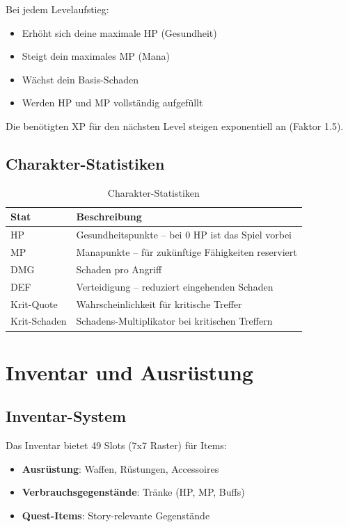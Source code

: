 \documentclass[
  a4paper,
  11pt,
  ngerman,
  parskip=half,
  bibliography=totoc,
  listof=totoc
]{scrreprt}
\begin{document}
Bei jedem Levelaufstieg:
\begin{itemize}
    \item Erhöht sich deine maximale \ac{HP} (Gesundheit)
    \item Steigt dein maximales \ac{MP} (Mana)
    \item Wächst dein Basis-Schaden
    \item Werden \ac{HP} und \ac{MP} vollständig aufgefüllt
\end{itemize}

Die benötigten \ac{XP} für den nächsten Level steigen exponentiell an (Faktor 1.5).

\subsection{Charakter-Statistiken}

\begin{table}[h]
\centering
\caption{Charakter-Statistiken}
\label{tab:stats}
\begin{tabular}{|l|p{8cm}|}
\hline
\textbf{Stat} & \textbf{Beschreibung} \\
\hline
HP & Gesundheitspunkte -- bei 0 HP ist das Spiel vorbei \\
MP & Manapunkte -- für zukünftige Fähigkeiten reserviert \\
DMG & Schaden pro Angriff \\
DEF & Verteidigung -- reduziert eingehenden Schaden \\
Krit-Quote & Wahrscheinlichkeit für kritische Treffer \\
Krit-Schaden & Schadens-Multiplikator bei kritischen Treffern \\
\hline
\end{tabular}
\end{table}

\section{Inventar und Ausrüstung}

\subsection{Inventar-System}

Das Inventar bietet 49 Slots (7x7 Raster) für Items:
\begin{itemize}
    \item \textbf{Ausrüstung}: Waffen, Rüstungen, Accessoires
    \item \textbf{Verbrauchsgegenstände}: Tränke (HP, MP, Buffs)
    \item \textbf{Quest-Items}: Story-relevante Gegenstände
\end{itemize}
\end{document}
